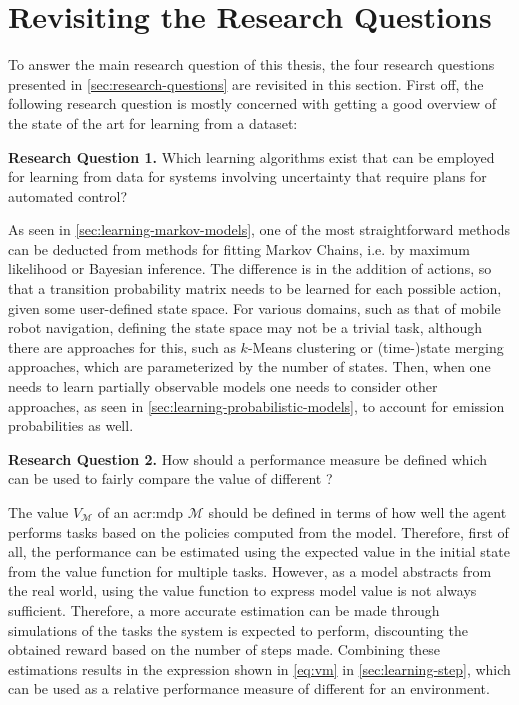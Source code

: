 \section{Revisiting the Research Questions}
\label{sec:revisiting-research-questions}

To answer the main research question of this thesis, the four research questions presented in \autoref{sec:research-questions} are revisited in this section.
First off, the following research question is mostly concerned with getting a good overview of the state of the art for learning  from a dataset:

\vspace{16pt}
\noindent%
\textbf{Research Question 1.} Which learning algorithms exist that can be employed for learning  from data for systems involving uncertainty that require plans for automated control?
\vspace{0pt}

As seen in \autoref{sec:learning-markov-models}, one of the most straightforward methods can be deducted from methods for fitting Markov Chains, i.e. by maximum likelihood or Bayesian inference.
The difference is in the addition of actions, so that a transition probability matrix needs to be learned for each possible action, given some user-defined state space.
For various domains, such as that of mobile robot navigation, defining the state space may not be a trivial task, although there are approaches for this, such as $k$-Means clustering or (time-)state merging approaches, which are parameterized by the number of states.
Then, when one needs to learn partially observable models one needs to consider other approaches, as seen in \autoref{sec:learning-probabilistic-models}, to account for emission probabilities as well.

\vspace{16pt}
\noindent%
\textbf{Research Question 2.} How should a performance measure be defined which can be used to fairly compare the value of different ?
\vspace{12pt}

The value $V_\mathcal{M}$ of an \acrshort{acr:mdp} $\mathcal{M}$ should be defined in terms of how well the agent performs tasks based on the policies computed from the model.
Therefore, first of all, the performance can be estimated using the expected value in the initial state from the value function for multiple tasks.
However, as a model abstracts from the real world, using the value function to express model value is not always sufficient.
Therefore, a more accurate estimation can be made through simulations of the tasks the system is expected to perform, discounting the obtained reward based on the number of steps made.
Combining these estimations results in the expression shown in \autoref{eq:vm} in \autoref{sec:learning-step}, which can be used as a relative performance measure of different  for an environment.

